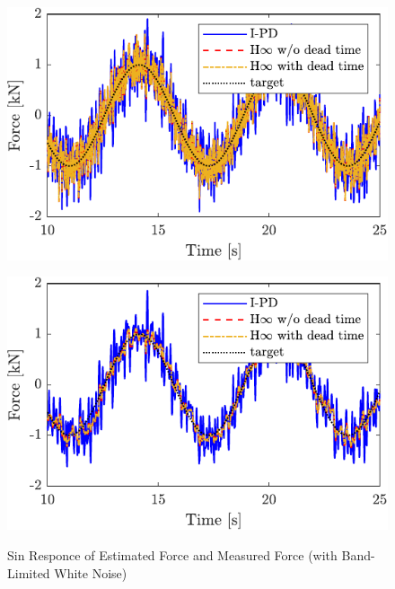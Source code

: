 \begin{figure}[t]
    \begin{minipage}{\minipageratio\hsize}
    \centering
        \includegraphics[keepaspectratio, width = \minifigwidth]{contents/ForceControl/figure/1115/crop-1115_diffnoise_estforce_sin.pdf}
        \label{fig4:crop-1115_diffnoise_estforce_sin}
    \end{minipage} 
    \begin{minipage}{\minipageratio\hsize}
    \centering
        \includegraphics[keepaspectratio, width = \minifigwidth]{contents/ForceControl/figure/1115/crop-1115_diffnoise_force_sin.pdf}
        \label{fig4:crop-1115_diffnoise_force_sin}
    \end{minipage}
    \caption{Sin Responce of Estimated Force and Measured Force (with Band-Limited White Noise)}
    \label{fig4:crop-1115_diffnoise_sin}
\end{figure}